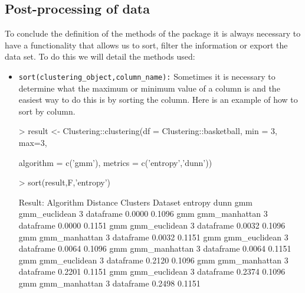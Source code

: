 \subsection*{Post-processing of data}

To conclude the definition of the methods of the package it is always necessary to have a functionality that allows us to sort, filter the information or export the data set. To do this we will detail the methods used:

\begin{itemize}
  \item \texttt{sort(clustering\_object,column\_name):} Sometimes it is necessary to determine what the maximum or minimum value of a column is and the easiest way to do this is by sorting the column. Here is an example of how to sort by column.
  \begin{Schunk}
\begin{Sinput}
> result <- Clustering::clustering(df = Clustering::basketball, min = 3, max=3,
\end{Sinput}
\begin{Sinput}
           algorithm = c('gmm'), metrics = c('entropy','dunn'))
 \end{Sinput}
\end{Schunk}
\begin{Schunk}
\begin{Sinput}
>  sort(result,F,'entropy')
\end{Sinput}
\begin{Soutput}
Result:
 Algorithm    Distance   Clusters   Dataset   entropy  dunn
   gmm    gmm_euclidean   3       dataframe  0.0000  0.1096
   gmm    gmm_manhattan   3       dataframe  0.0000  0.1151
   gmm    gmm_euclidean   3       dataframe  0.0032  0.1096
   gmm    gmm_manhattan   3       dataframe  0.0032  0.1151
   gmm    gmm_euclidean   3       dataframe  0.0064  0.1096
   gmm    gmm_manhattan   3       dataframe  0.0064  0.1151
   gmm    gmm_euclidean   3       dataframe  0.2120  0.1096
   gmm    gmm_manhattan   3       dataframe  0.2201  0.1151
   gmm    gmm_euclidean   3       dataframe  0.2374  0.1096
   gmm    gmm_manhattan   3       dataframe  0.2498  0.1151



\end{Soutput}
\end{Schunk}
\end{itemize}

